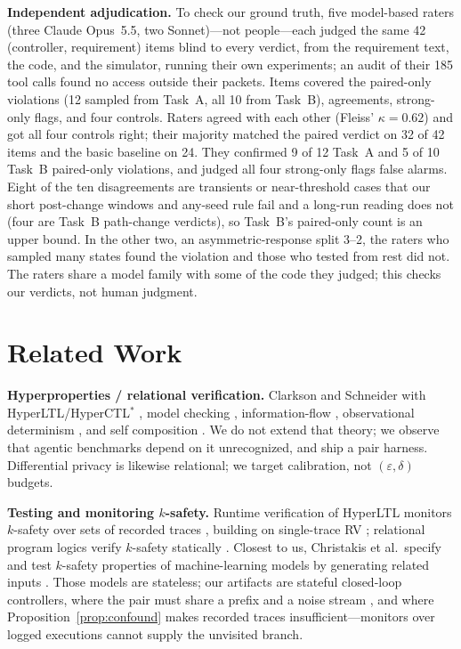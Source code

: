 \documentclass[conference]{IEEEtran}
\begin{document}
	\textbf{Independent adjudication.} To check our ground truth, five
	model-based raters (three Claude Opus~5.5, two Sonnet)---not
	people---each judged the same 42 (controller, requirement) items blind
	to every verdict, from the requirement text, the code, and the
	simulator, running their own experiments; an audit of their 185 tool
	calls found no access outside their packets. Items covered the
	paired-only violations (12 sampled from Task~A, all 10 from Task~B),
	agreements, strong-only flags, and four controls. Raters agreed with
	each other (Fleiss' $\kappa=0.62$) and got all four controls right;
	their majority matched the paired verdict on 32 of 42 items and the
	basic baseline on 24. They confirmed 9 of 12 Task~A and 5 of 10 Task~B
	paired-only violations, and judged all four strong-only flags false
	alarms. Eight of the ten disagreements are transients or near-threshold
	cases that our short post-change windows and any-seed rule fail and a
	long-run reading does not (four are Task~B path-change verdicts), so
	Task~B's paired-only count is an upper bound. In the other two, an
	asymmetric-response split 3--2, the raters who sampled many states found
	the violation and those who tested from rest did not. The raters share
	a model family with some of the code they judged; this checks our
	verdicts, not human judgment.
	
	\section{Related Work}
	\label{sec:related}
	
	\textbf{Hyperproperties / relational verification.} Clarkson and Schneider
	\cite{clarkson2010} with HyperLTL/HyperCTL$^*$ \cite{clarkson2014},
	model checking \cite{finkbeiner2015}, information-flow
	\cite{dimitrova2014}, observational determinism
	\cite{roscoe1995,zdancewic2003}, and self composition
	\cite{barthe2004,terauchi2005}. We do not extend that theory; we observe
	that agentic benchmarks depend on it unrecognized, and ship a pair harness.
	Differential privacy \cite{dwork2006,dwork2014} is likewise relational; we
	target calibration, not $(\varepsilon,\delta)$ budgets.
	
	\textbf{Testing and monitoring $k$-safety.} Runtime verification of
	HyperLTL monitors $k$-safety over sets of recorded traces
	\cite{agrawal2016,finkbeiner2019}, building on single-trace RV
	\cite{leucker2009,bartocci2018,falcone2018}; relational program logics
	verify $k$-safety statically \cite{sousa2016}. Closest to us, Christakis
	et al.\ specify and test $k$-safety properties of machine-learning
	models by generating related inputs \cite{christakis2023}. Those models
	are stateless; our artifacts are stateful closed-loop controllers, where
	the pair must share a prefix and a noise stream \cite{glasserman1992},
	and where Proposition~\ref{prop:confound} makes recorded traces
	insufficient---monitors over logged executions cannot supply the
	unvisited branch.
	
\end{document}
